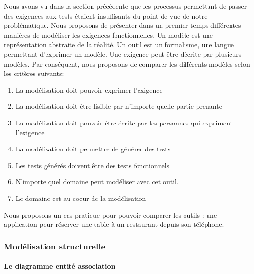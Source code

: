         Nous avons vu dans la section précédente que les processus permettant de passer des exigences aux tests étaient insuffisants du point de vue de notre problématique. Nous proposons de présenter dans un premier temps différentes manières de modéliser les exigences fonctionnelles. Un modèle est une représentation abstraite de la réalité. Un outil est un formalisme, une langue permettant d’exprimer un modèle. Une exigence peut être décrite par plusieurs modèles. Par conséquent, nous proposons de comparer les différents modèles selon les critères suivants:
        \begin{enumerate}
            \item La modélisation doit pouvoir exprimer l’exigence
        	\item La modélisation doit être lisible par n’importe quelle partie prenante
        	\item La modélisation doit pouvoir être écrite par les personnes qui expriment l’exigence
        	\item La modélisation doit permettre de générer des tests
        	\item Les tests générés doivent être des tests fonctionnels
        	\item N’importe quel domaine peut modéliser avec cet outil.
        	\item Le domaine est au coeur de la modélisation
        \end{enumerate}
        Nous proposons un cas pratique pour pouvoir comparer les outils : une application pour réserver une table à un restaurant depuis son téléphone.
        
        \subsubsection{Modélisation structurelle}
        
        \paragraph{Le diagramme entité association}
        
